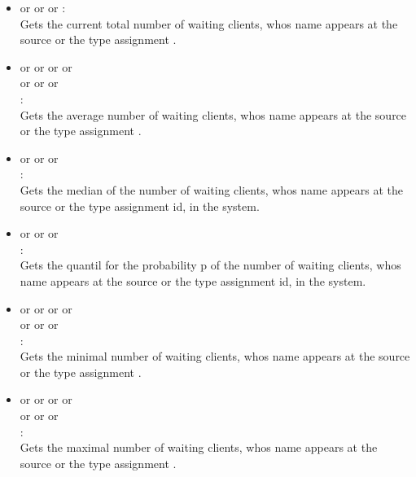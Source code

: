 \begin{itemize}    

\item
{} or  or  or :\\
Gets the current total number of waiting clients, whos name appears at the source or the type assignment .

\item
{} or  or  or  or\\
 or  or  or\\
:\\
Gets the average number of waiting clients, whos name appears at the source or the type assignment .

\item
{} or  or  or\\
:\\
Gets the median of the number of waiting clients, whos name appears at the source or the type assignment id, in the system.

\item
{} or  or  or\\
:\\
Gets the quantil for the probability p of the number of waiting clients, whos name appears at the source or the type assignment id, in the system.

\item
{} or  or  or  or\\
 or  or  or\\
:\\
Gets the minimal number of waiting clients, whos name appears at the source or the type assignment .

\item
{} or  or  or  or\\
 or  or  or\\
:\\
Gets the maximal number of waiting clients, whos name appears at the source or the type assignment .


\end{itemize}
